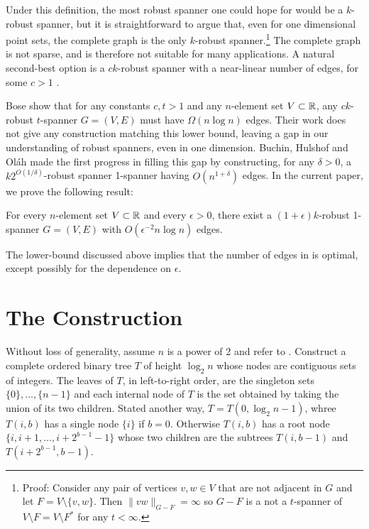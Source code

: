 \documentclass{patmorin}
\begin{document}
Under this definition, the most robust spanner one could hope for
would be a $k$-robust spanner, but it is straightforward to argue
that, even for one dimensional point sets, the complete graph is the
only $k$-robust spanner.\footnote{Proof: Consider any pair of vertices
$v,w\in V$ that are not adjacent in $G$ and let $F=V\setminus\{v,w\}$.
Then $\|vw\|_{G-F}=\infty$ so $G-F$ is a not a $t$-spanner of $V\setminus
F=V\setminus F^*$ for any $t<\infty$.} The complete graph is not sparse,
and is therefore not suitable for many applications. A natural second-best
option is a $ck$-robust spanner with a near-linear number of edges,
for some $c>1$ .

Bose \etal \cite[Theorem~3]{bose.dujmovic.ea:robust} show that for any
constants $c,t>1$ and any $n$-element set $V\subset\mathbb{R}$, any $ck$-robust
$t$-spanner $G=(V,E)$ must have $\Omega(n\log n)$ edges.  Their work
does not give any construction matching this lower bound, leaving a
gap in our understanding of robust spanners, even in one dimension.
Buchin, Hulshof and Ol\'ah \cite{buchin.hulshof.olah:robust} made the
first progress in filling this gap by constructing, for any $\delta>0$,
a $k2^{O(1/\delta)}$-robust spanner 1-spanner having $O(n^{1+\delta})$
edges.  In the current paper, we prove the following result:

\begin{thm}
  For every $n$-element set $V\subset\mathbb{R}$ and every $\epsilon>0$,
  there exist a $(1+\epsilon)k$-robust 1-spanner $G=(V,E)$ with
  $O(\epsilon^{-2}n\log n)$ edges.
\end{thm}

The lower-bound discussed above implies that the number of edges
in  is optimal, except possibly for the dependence on
$\epsilon$.


\section{The Construction}


Without loss of generality, assume $n$ is a power of 2 and refer to
.  Construct a complete ordered binary tree $T$ of height
$\log_2 n$ whose nodes are contiguous sets of integers.  The leaves of
$T$, in left-to-right order, are the singleton sets $\{0\},\ldots,\{n-1\}$
and each internal node of $T$ is the set obtained by taking the union
of its two children.  Stated another way, $T=T(0,\log_2 n-1)$, whree
$T(i,b)$ has a single node $\{i\}$ if $b=0$. Otherwise $T(i,b)$ has
a root node $\{i,i+1,\ldots,i+2^{b-1}-1\}$ whose two children are the
subtrees $T(i,b-1)$ and $T(i+2^{b-1}, b-1)$.
\end{document}
